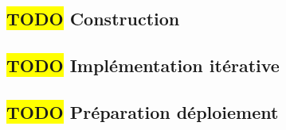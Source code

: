 \textcolor[RGB]{46, 116, 181}{\chapter{\colorbox{yellow}{TODO} Construction}}
\section{\colorbox{yellow}{TODO} Implémentation itérative}

\section{\colorbox{yellow}{TODO} Préparation déploiement}
